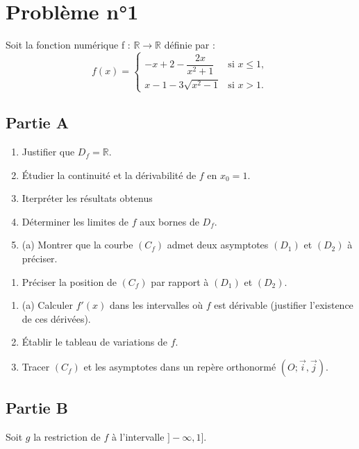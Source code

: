 \documentclass[12pt,a4paper]{article}
\begin{document}
\section*{Problème n°1}

Soit la fonction numérique  f : $\mathbb{R} \to \mathbb{R}$  définie par :
\[
f(x) =
\begin{cases}
-x + 2 - \dfrac{2x}{x^2 + 1} & \text{si } x \leq 1, \\
x - 1 - 3\sqrt{x^2 - 1} & \text{si } x > 1.
\end{cases}
\]

\subsection*{Partie A}

\begin{enumerate}
    \item Justifier que $D_f = \mathbb{R}$.
    \item Étudier la continuité et la dérivabilité de $f$ en $x_0 = 1$.
    \item Iterpréter les résultats obtenus
    \item Déterminer les limites de $f$ aux bornes de $D_f$.
    \item (a) Montrer que la courbe $(C_f)$ admet deux asymptotes $(D_1)$ et $(D_2)$ à préciser.
\end{enumerate}
\begin{enumerate}
    \item[(b)] Préciser la position de \( (C_f) \) par rapport à \( (D_1) \) et \( (D_2) \).
\end{enumerate}

\begin{enumerate}
    \item[5.] (a) Calculer \( f'(x) \) dans les intervalles où \( f \) est dérivable (justifier l’existence de ces dérivées).
    \item[(b)] Établir le tableau de variations de \( f \).
    \item[(c)] Tracer \( (C_f) \) et les asymptotes dans un repère orthonormé \( (O; \vec{i}, \vec{j}) \).
\end{enumerate}
\subsection*{Partie B}

Soit \( g \) la restriction de \( f \) à l’intervalle \( ] -\infty, 1] \).
\end{document}
